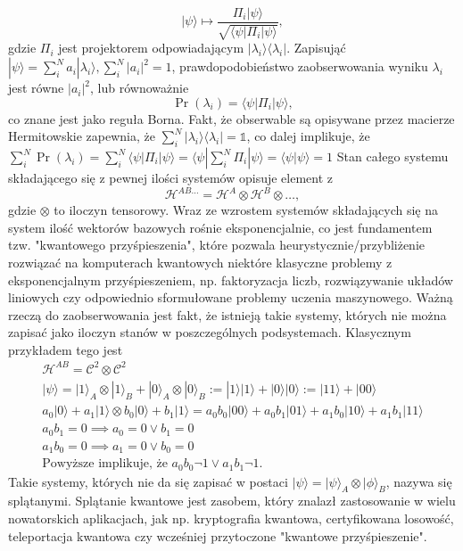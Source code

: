 \documentclass[10pt]{article} %
\newcommand{\Hx}[1]{\mathcal{H}^{#1}}
\newcommand{\Pro}[1]{\Pr(#1)}
\newcommand{\Ket}[1]{|#1\rangle}
\newcommand{\Bra}[1]{\langle#1|}
\newcommand{\Braket}[1]{\langle#1\rangle}
\newcommand{\KP}{\Ket{\psi}}
\newcommand{\BP}{\Bra{\psi}}
\begin{document}
\begin{equation}
\label{eq:cond_ev}
\Ket{\psi} \mapsto \frac{\Pi_i\Ket{\psi}}{\sqrt{\Bra{\psi}\Pi_i \Ket{\psi}}},
\end{equation}
gdzie $\Pi_i$ jest projektorem odpowiadającym $\Ket{\lambda_i}\Bra{\lambda_i}$. Zapisująć $\KP = \sum^N_i a_i \Ket{\lambda_i}, \sum^N_i |a_i|^2=1$, prawdopodobieństwo zaobserwowania wyniku $\lambda_i$ jest równe $|a_i|^2$, lub równoważnie
\begin{equation}
\Pro{\lambda_i} = \BP \Pi_i \KP,
\end{equation}
co znane jest jako reguła Borna. Fakt, że obserwable są opisywane przez macierze Hermitowskie zapewnia, że $\sum^N_i \Ket{\lambda_i}\Bra{\lambda_i} = \mathbb{1}$, co dalej implikuje, że $\sum^N_i \Pro{\lambda_i} = \sum^N_i \BP \Pi_i \KP = \BP \sum^N_i \Pi_i \KP = \Braket{\psi | \psi} = 1$
Stan całego systemu składającego się z pewnej ilości systemów opisuje element z
\begin{equation}
\Hx{AB\dots} = \Hx{A} \otimes \Hx{B} \otimes \dots,
\end{equation}
gdzie $\otimes$ to iloczyn tensorowy. Wraz ze wzrostem systemów składających się na system ilość wektorów bazowych rośnie eksponencjalnie, co jest fundamentem tzw. "kwantowego przyśpieszenia", które pozwala heurystycznie/przybliżenie rozwiązać na komputerach kwantowych niektóre klasyczne problemy z eksponencjalnym przyśpieszeniem,
np. faktoryzacja liczb, rozwiązywanie układów liniowych czy odpowiednio sformułowane problemy uczenia maszynowego.
Ważną rzeczą do zaobserwowania jest fakt, że istnieją takie systemy, których nie można zapisać jako iloczyn stanów w poszczególnych podsystemach. Klasycznym przykładem tego jest
\begin{gather*}
\Hx{AB} = \mathcal{C}^2 \otimes \mathcal{C}^2 \\
\KP = \Ket{1}_A \otimes \Ket{1}_B + \Ket{0}_A \otimes \Ket{0}_B := \Ket{1}\Ket{1} + \Ket{0}\Ket{0} := \Ket{11} + \Ket{00} \\
a_0\Ket{0} + a_1\Ket{1} \otimes b_0\Ket{0} + b_1\Ket{1} = a_0b_0 \Ket{00} + a_0b_1\Ket{01} + a_1b_0\Ket{10} + a_1b_1\Ket{11} \\
a_0b_1 = 0\implies a_0 = 0\vee b_1 = 0 \\
a_1b_0 = 0\implies a_1 = 0\vee b_0 = 0 \\
\text{Powyższe implikuje, że } a_0b_0 \neg 1 \vee a_1b_1 \neg 1.
\end{gather*} Takie systemy, których nie da się zapisać w postaci $\Ket{\psi} = \Ket{\psi}_A \otimes \Ket{\phi}_B$, nazywa się splątanymi. Splątanie kwantowe jest zasobem, który znalazł zastosowanie w wielu nowatorskich aplikacjach, jak np. kryptografia kwantowa, certyfikowana losowość, teleportacja kwantowa czy wcześniej przytoczone "kwantowe przyśpieszenie".
\end{document}
